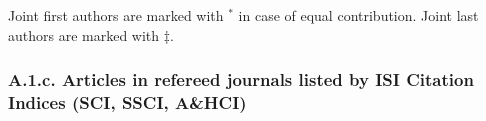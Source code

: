 \documentclass[10pt]{article}
\newcommand{\junk}[1]{}
\begin{document}
Joint first authors are marked with $^*$ in case of equal contribution. Joint last authors are marked with $\ddag$.


\junk{

\subsubsection*{A.1.a. Books, textbooks, scholarly monographs written by the faculty member}


}

\junk{
\subsubsection*{A.1.b. Volumes (books, anthologies, collections, bibliographies) edited by the faculty member (excluding conference proceedings)}



}

\subsubsection*{A.1.c. Articles in refereed journals listed by ISI Citation Indices (SCI, SSCI, A\&HCI)}



\junk{
\subsubsection*{A.1.d. Articles in refereed journals NOT listed by ISI Citation Indices (that is, not listed by SCI, SSCI or A\&HCI)}


}

\junk{

\subsubsection*{A.1.e. Chapters in books or monographs excluding conference proceedings}



}

\junk{
\subsubsection*{A.1.f. Book reviews, theater reviews, editorials}


}
\end{document}
